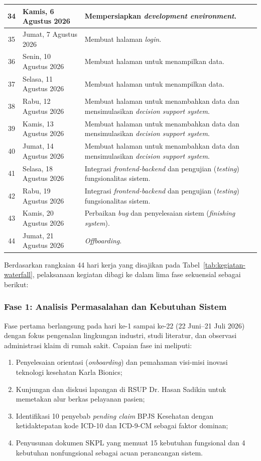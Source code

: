 \begin{small}
\begin{longtable}{|c|>{\raggedright\arraybackslash}p{4.0cm}|>{\raggedright\arraybackslash}p{7.8cm}|}
34 & Kamis, 6 Agustus 2026 & Mempersiapkan \textit{development environment}. \\ \hline
35 & Jumat, 7 Agustus 2026 & Membuat halaman \textit{login}. \\ \hline
36 & Senin, 10 Agustus 2026 & Membuat halaman untuk menampilkan data. \\ \hline
37 & Selasa, 11 Agustus 2026 & Membuat halaman untuk menampilkan data. \\ \hline
38 & Rabu, 12 Agustus 2026 & Membuat halaman untuk menambahkan data dan mensimulasikan \textit{decision support system}. \\ \hline
39 & Kamis, 13 Agustus 2026 & Membuat halaman untuk menambahkan data dan mensimulasikan \textit{decision support system}. \\ \hline
40 & Jumat, 14 Agustus 2026 & Membuat halaman untuk menambahkan data dan mensimulasikan \textit{decision support system}. \\ \hline
41 & Selasa, 18 Agustus 2026 & Integrasi \textit{frontend-backend} dan pengujian (\textit{testing}) fungsionalitas sistem. \\ \hline
42 & Rabu, 19 Agustus 2026 & Integrasi \textit{frontend-backend} dan pengujian (\textit{testing}) fungsionalitas sistem. \\ \hline
43 & Kamis, 20 Agustus 2026 & Perbaikan \textit{bug} dan penyelesaian sistem (\textit{finishing system}). \\ \hline
44 & Jumat, 21 Agustus 2026 & \textit{Offboarding}. \\ \hline
\end{longtable}
\end{small}

Berdasarkan rangkaian 44 hari kerja yang disajikan pada Tabel~\ref{tab:kegiatan-waterfall}, pelaksanaan kegiatan dibagi ke dalam lima fase sekuensial sebagai berikut:

\subsubsection{Fase 1: Analisis Permasalahan dan Kebutuhan Sistem}
Fase pertama berlangsung pada hari ke-1 sampai ke-22 (22 Juni--21 Juli 2026) dengan fokus pengenalan lingkungan industri, studi literatur, dan observasi administrasi klaim di rumah sakit. Capaian fase ini meliputi:
\begin{enumerate}
  \item Penyelesaian orientasi (\textit{onboarding}) dan pemahaman visi-misi inovasi teknologi kesehatan Karla Bionics;
  \item Kunjungan dan diskusi lapangan di RSUP Dr. Hasan Sadikin untuk memetakan alur berkas pelayanan pasien;
  \item Identifikasi 10 penyebab \textit{pending claim} BPJS Kesehatan dengan ketidaktepatan kode ICD-10 dan ICD-9-CM sebagai faktor dominan;
  \item Penyusunan dokumen SKPL yang memuat 15 kebutuhan fungsional dan 4 kebutuhan nonfungsional sebagai acuan perancangan sistem.
\end{enumerate}

